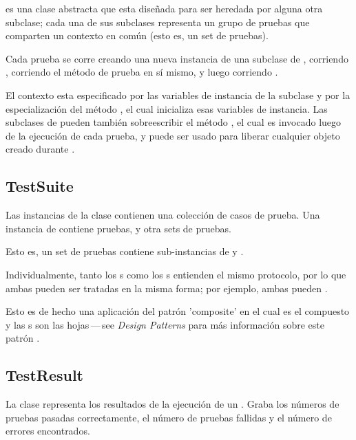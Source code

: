 \documentclass[a4paper,10pt,twoside]{book}
\begin{document}
 es una clase abstracta que esta dise\~nada para ser heredada por alguna otra subclase;
cada una de sus subclases representa un grupo de pruebas que comparten un contexto en com\'un (esto es, un set de pruebas).

Cada prueba se corre creando una nueva instancia de una subclase de ,
corriendo , corriendo el m\'etodo de prueba en s\'i mismo, y luego
corriendo .


El contexto esta especificado por las variables de instancia de la subclase y por la 
especializaci\'on del m\'etodo , el cual inicializa esas variables
de instancia. Las subclases de  pueden tambi\'en sobreescribir el m\'etodo
, el cual es invocado luego de la ejecuci\'on de cada prueba, y puede ser usado para
liberar cualquier objeto creado durante .


\subsection{TestSuite}

Las instancias de la clase  contienen una colecci\'on de casos de prueba.
Una instancia de  contiene pruebas, y otra sets de pruebas.

Esto es, un set de pruebas contiene sub-instancias de  y .

Individualmente, tanto los s como los s entienden el mismo protocolo,
por lo que ambas pueden ser tratadas en la misma forma; por ejemplo, ambas pueden .

Esto es de hecho una aplicaci\'on del patr\'on 'composite' en el cual  es el compuesto
y las s son las hojas\,---\,see \textit{Design Patterns} para m\'as informaci\'on sobre este patr\'on \cite{Gamm95a}.

\subsection{TestResult}

La clase  representa los resultados de la ejecuci\'on de un .
Graba los n\'umeros de pruebas pasadas correctamente, el n\'umero de pruebas fallidas y el n\'umero
de errores encontrados.
\end{document}
